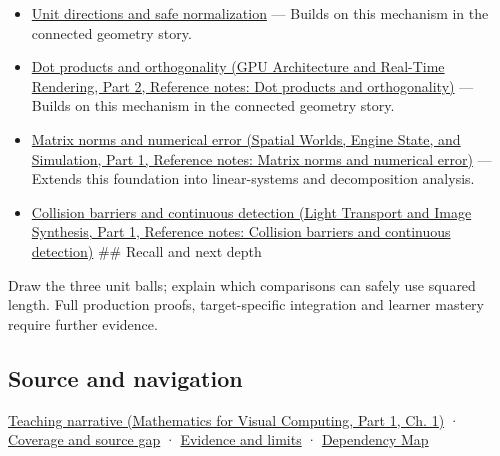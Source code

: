 \hypertarget{appendix-49933872bb51-used-by}{}

\begin{itemize}
\item
  \hyperref[appendix-f744e41b95b4]{Unit directions and safe normalization} --- Builds on this mechanism in the connected geometry story.
\item
  \href{../06-GPU-Architecture-and-Real-Time-Rendering-P02/main.pdf\#appendix-8bc4e8fc547c}{Dot products and orthogonality (GPU Architecture and Real-Time Rendering, Part 2, Reference notes: Dot products and orthogonality)} --- Builds on this mechanism in the connected geometry story.
\item
  \href{../05-Spatial-Worlds-Engine-State-and-Simulation-P01/main.pdf\#appendix-f8657bac66e5}{Matrix norms and numerical error (Spatial Worlds, Engine State, and Simulation, Part 1, Reference notes: Matrix norms and numerical error)} --- Extends this foundation into linear-systems and decomposition analysis.
\item
  \href{../04-Light-Transport-and-Image-Synthesis-P01/main.pdf\#appendix-a9ba01fa72a6}{Collision barriers and continuous detection (Light Transport and Image Synthesis, Part 1, Reference notes: Collision barriers and continuous detection)} \#\# Recall and next depth
\end{itemize}

Draw the three unit balls; explain which comparisons can safely use squared length. Full production proofs, target-specific integration and learner mastery require further evidence.

\subsection{Source and navigation}\label{appendix-49933872bb51-source-and-navigation}

\hypertarget{appendix-49933872bb51-source-and-navigation}{}

\href{../02-Mathematics-for-Visual-Computing-P01/main.pdf\#01-foundations-i-ch017-a-ruler-needs-more-than-coordinate-components}{Teaching narrative (Mathematics for Visual Computing, Part 1, Ch. 1)} · \hyperref[appendix-fd090d982a15-phase-6---parts-501-600]{Coverage and source gap} · \hyperref[appendix-a103e7846d21-phase-6---source-analysis-and-verification]{Evidence and limits} · \hyperref[appendix-4ad47bdd269a]{Dependency Map}
